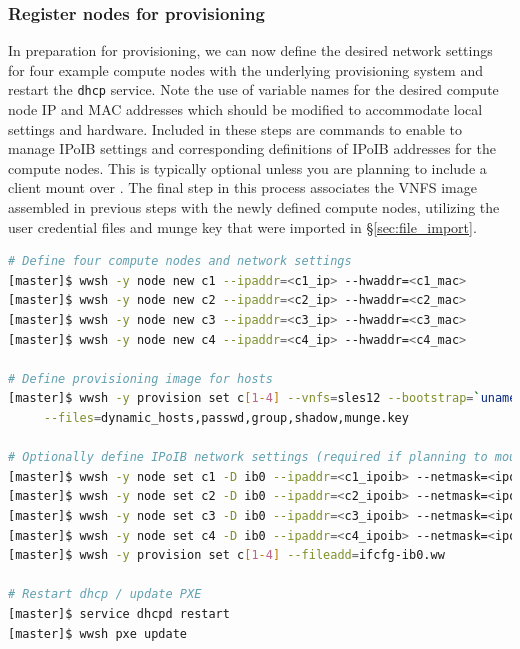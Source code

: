 \documentclass[letterpaper]{article}
\begin{document}
\subsubsection{Register nodes for provisioning}

In preparation for provisioning, we can now define the desired network settings
for four example compute nodes with the underlying provisioning system and
restart the \texttt{dhcp} service. Note the use of variable names for the
desired compute node IP and MAC addresses which should be modified to
accommodate local settings and hardware. Included in these steps are commands
to enable \Warewulf{} to manage IPoIB settings and corresponding definitions of
IPoIB addresses for the compute nodes. This is typically optional unless you
are planning to include a \Lustre{} client mount over \InfiniBand{}.  The final step
in this process associates the VNFS image assembled in previous steps with the
newly defined compute nodes, utilizing the user credential files and munge key
that were imported in \S\ref{sec:file_import}.


\begin{lstlisting}[language=bash,keywords={},upquote=true,basicstyle=\footnotesize\ttfamily]
# Define four compute nodes and network settings 
[master]$ wwsh -y node new c1 --ipaddr=<c1_ip> --hwaddr=<c1_mac> 
[master]$ wwsh -y node new c2 --ipaddr=<c2_ip> --hwaddr=<c2_mac> 
[master]$ wwsh -y node new c3 --ipaddr=<c3_ip> --hwaddr=<c3_mac> 
[master]$ wwsh -y node new c4 --ipaddr=<c4_ip> --hwaddr=<c4_mac> 

# Define provisioning image for hosts
[master]$ wwsh -y provision set c[1-4] --vnfs=sles12 --bootstrap=`uname -r` \
     --files=dynamic_hosts,passwd,group,shadow,munge.key 

# Optionally define IPoIB network settings (required if planning to mount Lustre* over IB)
[master]$ wwsh -y node set c1 -D ib0 --ipaddr=<c1_ipoib> --netmask=<ipoib_netmask>
[master]$ wwsh -y node set c2 -D ib0 --ipaddr=<c2_ipoib> --netmask=<ipoib_netmask>
[master]$ wwsh -y node set c3 -D ib0 --ipaddr=<c3_ipoib> --netmask=<ipoib_netmask>
[master]$ wwsh -y node set c4 -D ib0 --ipaddr=<c4_ipoib> --netmask=<ipoib_netmask>
[master]$ wwsh -y provision set c[1-4] --fileadd=ifcfg-ib0.ww

# Restart dhcp / update PXE
[master]$ service dhcpd restart
[master]$ wwsh pxe update
\end{lstlisting}
\end{document}

